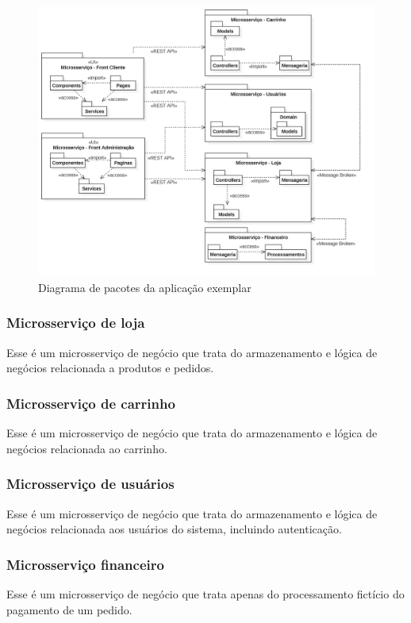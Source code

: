 \begin{figure}[htb]
	\caption{\label{figura-diagrama-de-pacotes}Diagrama de pacotes da aplicação exemplar}
	\begin{center}
	    \includegraphics[scale=0.27]{Diagramas/imagens/Pacotes.jpg}
	\end{center}
\end{figure}

\subsubsection*{Microsserviço de loja}
Esse é um microsserviço de negócio que trata do armazenamento e lógica de negócios relacionada a produtos e pedidos.

\subsubsection*{Microsserviço de carrinho}
Esse é um microsserviço de negócio que trata do armazenamento e lógica de negócios relacionada ao carrinho.

\subsubsection*{Microsserviço de usuários}
Esse é um microsserviço de negócio que trata do armazenamento e lógica de negócios relacionada aos usuários do sistema, incluindo autenticação.

\subsubsection*{Microsserviço financeiro}
Esse é um microsserviço de negócio que trata apenas do processamento fictício do pagamento de um pedido.

